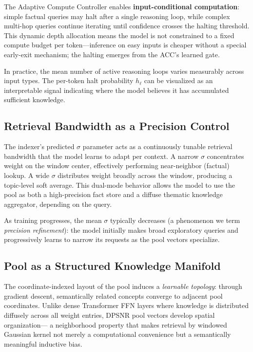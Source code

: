 \documentclass[11pt]{article}
\begin{document}
The Adaptive Compute Controller enables \textbf{input-conditional computation}:
simple factual queries may halt after a single reasoning loop, while complex
multi-hop queries continue iterating until confidence crosses the halting
threshold.
This dynamic depth allocation means the model is not constrained to a fixed
compute budget per token—inference on easy inputs is cheaper without a special
early-exit mechanism; the halting emerges from the ACC's learned gate.

In practice, the mean number of active reasoning loops varies measurably
across input types. The per-token halt probability $h_\ell$ can be visualized
as an interpretable signal indicating where the model believes it has
accumulated sufficient knowledge.

\subsection{Retrieval Bandwidth as a Precision Control}
\label{sec:bandwidth}

The indexer's predicted $\sigma$ parameter acts as a continuously tunable
retrieval bandwidth that the model learns to adapt per context.
A narrow $\sigma$ concentrates weight on the window center, effectively
performing near-neighbor (factual) lookup.
A wide $\sigma$ distributes weight broadly across the window, producing a
topic-level soft average.
This dual-mode behavior allows the model to use the pool as both a high-precision
fact store and a diffuse thematic knowledge aggregator, depending on the query.

As training progresses, the mean $\sigma$ typically decreases (a phenomenon
we term \emph{precision refinement}): the model initially makes broad
exploratory queries and progressively learns to narrow its requests as the
pool vectors specialize.

\subsection{Pool as a Structured Knowledge Manifold}
\label{sec:manifold}

The coordinate-indexed layout of the pool induces a \emph{learnable topology}:
through gradient descent, semantically related concepts converge to
adjacent pool coordinates.
Unlike dense Transformer FFN layers where knowledge is distributed diffusely
across all weight entries, DPSNR pool vectors develop spatial organization—
a neighborhood property that makes retrieval by windowed Gaussian kernel
not merely a computational convenience but a semantically meaningful
inductive bias.
\end{document}
